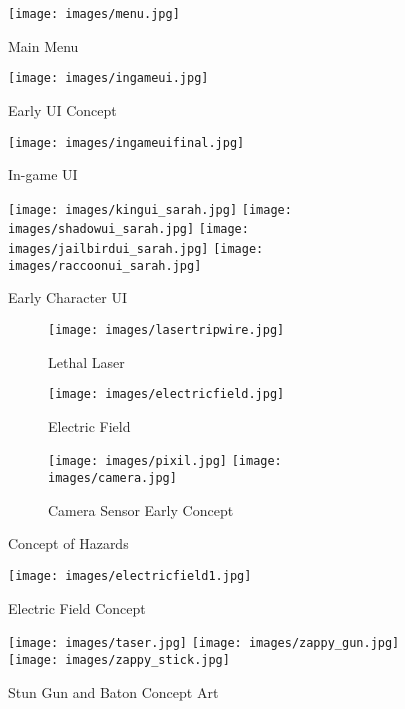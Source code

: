 \documentclass[10pt]{report}
\begin{document}
\begin{figure}[H]
	\texttt{[image: images/menu.jpg]}
    \caption{Main Menu}
\end{figure}

\begin{figure}[H]
	\texttt{[image: images/ingameui.jpg]}
    \caption{Early UI Concept}
\end{figure}

\begin{figure}[H]
	\texttt{[image: images/ingameuifinal.jpg]}
    \caption{In-game UI}
\end{figure}

\begin{figure}[H]
    \centering
	\texttt{[image: images/kingui\_sarah.jpg]}
	\texttt{[image: images/shadowui\_sarah.jpg]}
	\texttt{[image: images/jailbirdui\_sarah.jpg]}
	\texttt{[image: images/raccoonui\_sarah.jpg]}
    \caption{Early Character UI}
\end{figure}

\begin{figure}[H]
    \centering
    \begin{subfigure}[b]{0.4\linewidth}
        \texttt{[image: images/lasertripwire.jpg]}
        \caption{Lethal Laser}
    \end{subfigure}
    \begin{subfigure}[b]{0.4\linewidth}
        \texttt{[image: images/electricfield.jpg]}
        \caption{Electric Field}
    \end{subfigure}
    \begin{subfigure}[b]{\linewidth}
        \centering
        \texttt{[image: images/pixil.jpg]}
        \texttt{[image: images/camera.jpg]}
        \caption{Camera Sensor Early Concept}
    \end{subfigure}
    \caption{Concept of Hazards}
\end{figure}

\begin{figure}[H]
	\texttt{[image: images/electricfield1.jpg]}
    \caption{Electric Field Concept}
\end{figure}

\begin{figure}[H]
    \centering
	\texttt{[image: images/taser.jpg]}
	\texttt{[image: images/zappy\_gun.jpg]}
	\texttt{[image: images/zappy\_stick.jpg]}
    \caption{Stun Gun and Baton Concept Art}
\end{figure}
\end{document}
